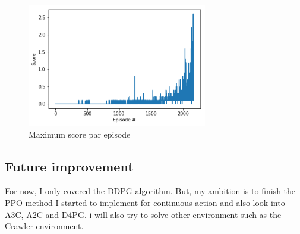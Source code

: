 \documentclass[12pt]{article}
\begin{document}
\begin{center}
\begin{figure}[H]
  \center
  \includegraphics[width=0.7\textwidth]{../PNG/ma_ddpg.png}
  \caption{Maximum score par episode}
  \label{fig:ma_ddpg}
\end{figure}
\end{center}


\subsection{Future improvement}
For now, I only covered the DDPG\cite{LillicrapHPHETS15} algorithm. But, my ambition is to finish the PPO method\cite{ClaveraRS0AA18} I started to implement for continuous action and also look into A3C\cite{MnihBMGLHSK16}, A2C\cite{MnihBMGLHSK16} and D4PG\cite{Barth2018}. i will also try to solve other environment such as the Crawler environment.


\end{document}
